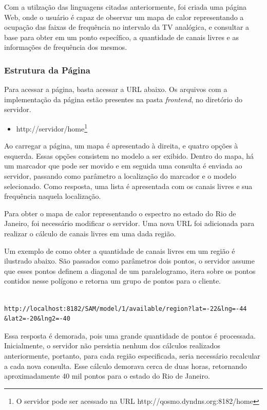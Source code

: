 Com a utilzação das linguagens citadas anteriormente, foi criada uma página Web, onde o usuário é capaz de observar um mapa de calor representando a ocupação das faixas de frequência no intervalo da TV analógica, e consultar a base para obter em um ponto específico, a quantidade de canais livres e as informações de frequência dos mesmos.


\subsubsection{Estrutura da Página}

Para acessar a página, basta acessar a URL abaixo. Os arquivos com a implementação da página estão presentes na pasta \textit{frontend}, no diretório do servidor.

\begin{itemize}
\item http://servidor/home\footnote{O servidor pode ser acessado na URL http://qosmo.dyndns.org:8182/home}
\end{itemize}

Ao carregar a página, um mapa é apresentado à direita, e quatro opções à esquerda. Essas opções consistem no modelo a ser exibido. Dentro do mapa, há um marcador que pode ser movido e em seguida uma consulta é enviada ao servidor, passando como parâmetro a localização do marcador e o modelo selecionado. Como resposta, uma lista é apresentada com os canais livres e sua frequência naquela localização.

Para obter o mapa de calor representando o espectro no estado do Rio de Janeiro, foi necessário modificar o servidor. Uma nova URL foi adicionada para realizar o cálculo de canais livres em uma dada região.

Um exemplo de como obter a quantidade de canais livres em um região é ilustrado abaixo. São passados como parâmetros dois pontos, o servidor assume que esses pontos definem a diagonal de um paralelogramo, itera sobre os pontos contidos nesse polígono e retorna um grupo de pontos para o cliente.


\begin{lstlisting}			

http://localhost:8182/SAM/model/1/available/region?lat=-22&lng=-44
&lat2=-20&lng2=-40

\end{lstlisting}

Essa resposta é demorada, pois uma grande quantidade de pontos é processada. Inicialmente, o servidor não persistia nenhum dos cálculos realizados anteriormente, portanto, para cada região especificada, seria necessário recalcular a cada nova consulta. Esse cálculo demorava cerca de duas horas, retornando aproximadamente 40 mil pontos para o estado do Rio de Janeiro.

